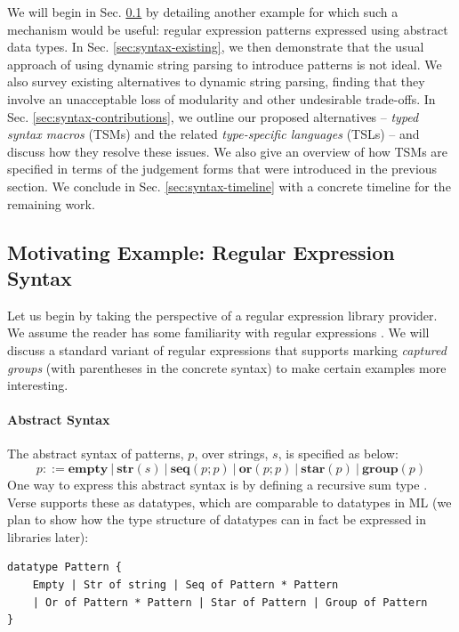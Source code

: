 We will begin in Sec. \ref{sec:examples} by detailing another example for which such a mechanism would be useful: regular expression patterns expressed using abstract data types. In Sec. \ref{sec:syntax-existing}, we then demonstrate that the usual approach of using dynamic string parsing to introduce patterns is not ideal. We also survey existing alternatives to dynamic string parsing, finding that they involve an unacceptable loss of modularity and other undesirable trade-offs. In Sec. \ref{sec:syntax-contributions}, we outline our proposed alternatives -- \emph{typed syntax macros} (TSMs) and the related \emph{type-specific languages} (TSLs) -- and discuss how they resolve these issues. We also give an overview of how TSMs are specified in terms of the judgement forms that were introduced in the previous section. We conclude in Sec. \ref{sec:syntax-timeline} with a concrete timeline for the remaining work.



\subsection{Motivating Example: Regular Expression Syntax}\label{sec:examples}\label{sec:syntax-examples}
Let us begin by taking the perspective of a regular expression library provider. We assume the reader has some familiarity with regular expressions \cite{Thompson:1968:PTR:363347.363387}. We will discuss a standard variant of regular expressions that supports marking \emph{captured groups} (with parentheses in the concrete syntax) to make certain examples more interesting.

\paragraph{Abstract Syntax} The abstract syntax of {patterns}, $p$, over strings, $s$, is specified as below:\[p ::= \textbf{empty} ~|~ \textbf{str}(s) ~|~ \textbf{seq}(p; p) ~|~ \textbf{or}(p; p) ~|~ \textbf{star}(p) ~|~ \textbf{group}(p)\]
One way to express this abstract syntax is by defining a recursive sum type \cite{pfpl}. Verse supports these as datatypes, which are comparable to datatypes in ML (we plan to show how the type structure  of datatypes can in fact be expressed in libraries later):

\begin{lstlisting}[numbers=none]
datatype Pattern {
    Empty | Str of string | Seq of Pattern * Pattern 
    | Or of Pattern * Pattern | Star of Pattern | Group of Pattern
}
\end{lstlisting}

